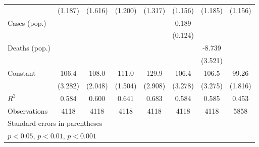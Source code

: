 \documentclass{article}
\begin{document}
{\begin{longtable}{l*{7}{c}}
                &  (1.187)         &  (1.616)         &  (1.200)         &  (1.317)         &  (1.156)         &  (1.185)         &  (1.156)         \\
Cases (pop.)    &                  &                  &                  &                  &    0.189         &                  &                  \\
                &                  &                  &                  &                  &  (0.124)         &                  &                  \\
Deaths (pop.)   &                  &                  &                  &                  &                  &   -8.739\sym{*}  &                  \\
                &                  &                  &                  &                  &                  &  (3.521)         &                  \\
Constant        &    106.4\sym{***}&    108.0\sym{***}&    111.0\sym{***}&    129.9\sym{***}&    106.4\sym{***}&    106.5\sym{***}&    99.26\sym{***}\\
                &  (3.282)         &  (2.048)         &  (1.504)         &  (2.908)         &  (3.278)         &  (3.275)         &  (1.816)         \\
\hline
\(R^{2}\)       &    0.584         &    0.600         &    0.641         &    0.683         &    0.584         &    0.585         &    0.453         \\
Observations    &     4118         &     4118         &     4118         &     4118         &     4118         &     4118         &     5858         \\
\hline\hline
\multicolumn{8}{l}{\footnotesize Standard errors in parentheses}\\
\multicolumn{8}{l}{\footnotesize \sym{*} \(p<0.05\), \sym{**} \(p<0.01\), \sym{***} \(p<0.001\)}\\
\end{longtable}
}
\end{document}
